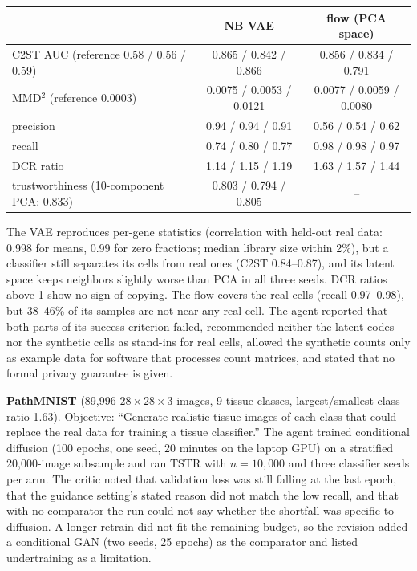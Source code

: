\documentclass[10pt]{article}
\begin{document}
\begin{center}\small
\begin{tabular}{lcc}
\toprule
 & NB VAE & flow (PCA space)\\
\midrule
C2ST AUC (reference 0.58 / 0.56 / 0.59) & 0.865 / 0.842 / 0.866 & 0.856 / 0.834 / 0.791\\
MMD$^2$ (reference 0.0003) & 0.0075 / 0.0053 / 0.0121 & 0.0077 / 0.0059 / 0.0080\\
precision & 0.94 / 0.94 / 0.91 & 0.56 / 0.54 / 0.62\\
recall & 0.74 / 0.80 / 0.77 & 0.98 / 0.98 / 0.97\\
DCR ratio & 1.14 / 1.15 / 1.19 & 1.63 / 1.57 / 1.44\\
trustworthiness (10-component PCA: 0.833) & 0.803 / 0.794 / 0.805 & --\\
\bottomrule
\end{tabular}
\end{center}

The VAE reproduces per-gene statistics (correlation with held-out real data: 0.998 for means, 0.99 for zero
fractions; median library size within 2\%), but a classifier still separates its cells from real ones (C2ST 0.84--0.87),
and its latent space keeps neighbors slightly worse than PCA in all three seeds. DCR ratios above 1 show no sign of
copying. The flow covers the real cells (recall 0.97--0.98), but 38--46\% of its samples are not near any real cell.
The agent reported that both parts of its success criterion failed, recommended neither the latent codes nor the
synthetic cells as stand-ins for real cells, allowed the synthetic counts only as example data for software that
processes count matrices, and stated that no formal privacy guarantee is given.

\textbf{PathMNIST} (89,996 $28\times28\times3$ images, 9 tissue classes, largest/smallest class ratio 1.63). Objective:
``Generate realistic tissue images of each class that could replace the real data for training a tissue classifier.''
The agent trained conditional diffusion (100 epochs, one seed, 20 minutes on the laptop GPU) on a stratified
20,000-image subsample and ran TSTR with $n=10{,}000$ and three classifier seeds per arm. The critic noted that
validation loss was still falling at the last epoch, that the guidance setting's stated reason did not match the low
recall, and that with no comparator the run could not say whether the shortfall was specific to diffusion. A longer
retrain did not fit the remaining budget, so the revision added a conditional GAN (two seeds, 25 epochs) as the
comparator and listed undertraining as a limitation.
\end{document}
